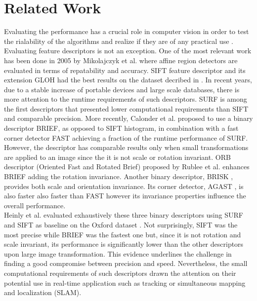 \section{Related Work}
\label{sec:relatedwork}

Evaluating the performance has a crucial role in computer vision in order to test the rialability of the algorithms and realize if they are of any practical use \cite{christensen02}. Evaluating feature descriptors is not an exception. One of the most relevant work has been done in 2005 by Mikolajczyk et al. \cite{mikolajczyk05} where affine region detectors are evaluated in terms of repatability and accuracy. SIFT feature descriptor \cite{lowe04} and its extension GLOH \cite{mikolajczyk05} had the best results on the dataset decribed in \cite{mikolajczyk2005b}. In recent years, due to a stable increase of portable devices and large scale databases, there is more attention to the runtime requirements of such descriptors. SURF \cite{bay2008} is among the first descriptors that presented lower computational requirements than SIFT and comparable precision. More recently, Calonder et al. \cite{calonder10} proposed to use a binary descriptor BRIEF, as opposed to SIFT histogram, in combination with a fast corner detector FAST \cite{rosten06} achieving a fraction of the runtime performance of SURF. However, the descriptor has comparable results only when small transformations are applied to an image since the it is not scale or rotation invariant. ORB descriptor (Oriented Fast and Rotated Brief) proposed by Rublee et al. \cite{rublee11} enhances BRIEF adding the rotation invariance. Another binary descriptor, BRISK \cite{leutenegger11}, provides both scale and orientation invariance. Its corner detector, AGAST \cite{mair2010} , is also faster also faster than FAST however its invariance properties influence the overall performance.\\ 
Heinly et al. \cite{heinly2012} evaluated exhaustively these three binary descriptors using SURF and SIFT as baseline on the Oxford dataset \cite{mikolajczyk2005b}. Not surprisingly, SIFT was the most precise while BRIEF was the fastest one but, since it is not rotation and scale invariant, its performance is significantly lower than the other descriptors upon large image transformation. This evidence underlines the challenge in finding a good compromise between precision and speed. Nevertheless, the small computational requirements of such descriptors drawn the attention on their potential use in real-time application such as tracking or simultaneous mapping and localization (SLAM). \\
